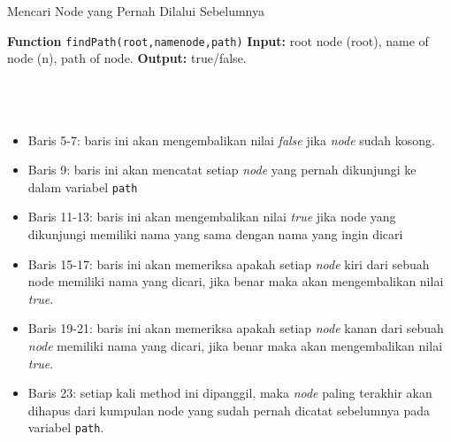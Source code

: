 \begin{minipage}{.8\linewidth}
\begin{algorithm}[H]
  \caption{Mencari Node yang Pernah Dilalui Sebelumnya}\label{alg:6}
  \begin{algorithmic}[1]
  \State \textbf{Function} \texttt{findPath(root,namenode,path)}
  \State \textbf{Input:} root node (root), name of node (n), path of node.
  \State \textbf{Output:} true/false.
  \\
  \EndIf
  \\
  \EndIf
  \\
  \EndIf
  \\
  \EndIf
  \end{algorithmic}
\end{algorithm}
\end{minipage}

\vspace{0.2cm}
\begin{itemize}
\item Baris 5-7: baris ini akan mengembalikan nilai \textit{false} jika \textit{node} sudah kosong.
\item Baris 9: baris ini akan mencatat setiap \textit{node} yang pernah dikunjungi ke dalam variabel \texttt{path}
\item Baris 11-13: baris ini akan mengembalikan nilai \textit{true} jika node yang dikunjungi memiliki nama yang sama dengan nama yang ingin dicari 
\item Baris 15-17: baris ini akan memeriksa apakah setiap \textit{node} kiri dari sebuah node memiliki nama yang dicari, jika benar maka akan mengembalikan nilai \textit{true}.
\item Baris 19-21: baris ini akan memeriksa apakah setiap \textit{node} kanan dari sebuah \textit{node} memiliki nama yang dicari, jika benar maka akan mengembalikan nilai \textit{true}.
\item Baris 23: setiap kali method ini dipanggil, maka \textit{node} paling terakhir akan dihapus dari kumpulan node yang sudah pernah dicatat sebelumnya pada variabel \texttt{path}.
\end{itemize}


